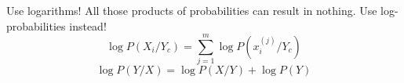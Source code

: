 \bgroup  
\begin{frame}{Use logarithms!}
All those products of probabilities can result in nothing. Use log-probabilities instead!
\begin{equation*}
\log{P(X_i/Y_c)}=\sum_{j=1}^m \log{P(x_i^{(j)}/Y_c)}
\end{equation*}
\begin{equation*}
\log{P(Y/X)} = \log{P(X/Y)} + \log{P(Y)}
\end{equation*}
\end{frame}
\egroup